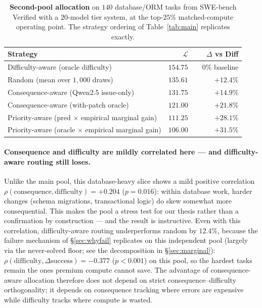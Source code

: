 \documentclass{article}
\begin{document}
\begin{table}[h]
\centering
\caption{\textbf{Second-pool allocation} on $140$ database/ORM tasks
from SWE-bench Verified with a $20$-model tier system, at the
top-$25\%$ matched-compute operating point. The strategy ordering of
Table~\ref{tab:main} replicates exactly.}
\label{tab:seconddomain}
\small
\begin{tabular}{lrr}
\toprule
Strategy & $\mathcal{L}$ & $\Delta$ vs Diff \\
\midrule
Difficulty-aware (oracle difficulty)        & $154.75$ & ~~$0\%$ baseline \\
Random (mean over $1{,}000$ draws)          & $135.61$ & $+12.4\%$ \\
Consequence-aware (Qwen2.5 issue-only)      & $131.75$ & $+14.9\%$ \\
Consequence-aware (with-patch oracle)       & $121.00$ & $+21.8\%$ \\
Priority-aware (pred $\times$ empirical marginal gain)   & $111.25$ & $+28.1\%$ \\
Priority-aware (oracle $\times$ empirical marginal gain) & $\mathbf{106.00}$ & $\mathbf{+31.5\%}$ \\
\bottomrule
\end{tabular}
\end{table}

\paragraph{Consequence and difficulty are mildly correlated here ---
and difficulty-aware routing still loses.} Unlike the main pool,
this database-heavy slice shows a mild positive correlation
$\rho(\mathrm{consequence}, \mathrm{difficulty}) = +0.204$
($p = 0.016$): within database work, harder changes (schema
migrations, transactional logic) do skew somewhat more consequential.
This makes the pool a stress test for our thesis rather than a
confirmation by construction --- and the result is instructive.
Even with this correlation, difficulty-aware routing underperforms
random by $12.4\%$, because the failure mechanism of
\S\ref{sec:whyfail} replicates on this independent pool (largely via
the never-solved floor; see the decomposition in \S\ref{sec:marginal}):
$\rho(\mathrm{difficulty}, \Delta\mathrm{success}) = -0.377$
($p < 0.001$) on this pool, so the hardest tasks remain the ones
premium compute cannot save. The advantage of consequence-aware
allocation therefore does not depend on strict
consequence--difficulty orthogonality; it depends on consequence
tracking where errors are expensive while difficulty tracks where
compute is wasted.
\end{document}
